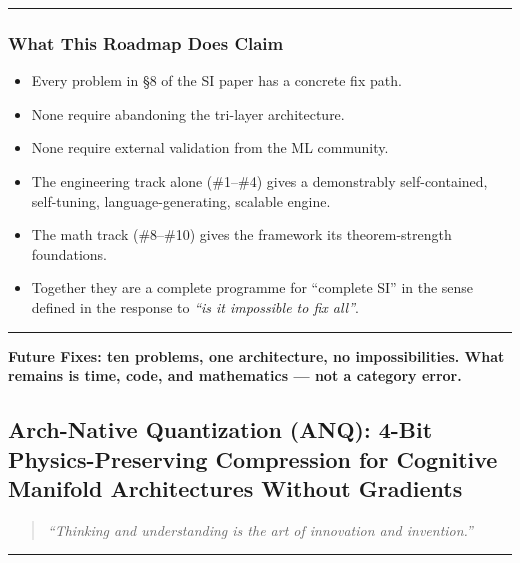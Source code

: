 \documentclass[
  11pt,
  a4paper,
]{article}
\providecommand{\tightlist}{%
  \setlength{\itemsep}{0pt}\setlength{\parskip}{0pt}}
\begin{document}
\begin{center}\rule{0.5\linewidth}{0.5pt}\end{center}

\subsubsection{What This Roadmap Does
Claim}\label{what-this-roadmap-does-claim}

\begin{itemize}
\tightlist
\item
  Every problem in §8 of the SI paper has a concrete fix path.
\item
  None require abandoning the tri-layer architecture.
\item
  None require external validation from the ML community.
\item
  The engineering track alone (\#1--\#4) gives a demonstrably
  self-contained, self-tuning, language-generating, scalable engine.
\item
  The math track (\#8--\#10) gives the framework its theorem-strength
  foundations.
\item
  Together they are a complete programme for ``complete SI'' in the
  sense defined in the response to \emph{``is it impossible to fix
  all''}.
\end{itemize}

\begin{center}\rule{0.5\linewidth}{0.5pt}\end{center}

\textbf{Future Fixes: ten problems, one architecture, no
impossibilities. What remains is time, code, and mathematics --- not a
category error.}

\newpage

\subsection{Arch-Native Quantization (ANQ): 4-Bit Physics-Preserving
Compression for Cognitive Manifold Architectures Without
Gradients}\label{arch-native-quantization-anq-4-bit-physics-preserving-compression-for-cognitive-manifold-architectures-without-gradients}

\begin{quote}
\emph{``Thinking and understanding is the art of innovation and
invention.''}
\end{quote}

\begin{center}\rule{0.5\linewidth}{0.5pt}\end{center}
\end{document}
